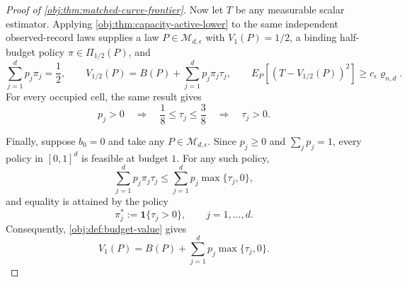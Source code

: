 \begin{proof}[Proof of \cref{obj:thm:matched-curve-frontier}]
Now let \(T\) be any measurable scalar estimator. Applying \cref{obj:thm:capacity-active-lower} to the same independent observed-record laws supplies a law \(P\in\mathcal M_{d,\epsilon}\) with \(V_1(P)=1/2\), a binding half-budget policy \(\pi\in\Pi_{1/2}(P)\), and
\[
\sum_{j=1}^d p_j\pi_j=\frac12,\qquad
V_{1/2}(P)=B(P)+\sum_{j=1}^d p_j\pi_j\tau_j,\qquad
E_P\!\left[(T-V_{1/2}(P))^2\right]\ge c_\epsilon\varrho_{n,d}.
\]
For every occupied cell, the same result gives
\[
p_j>0\quad\Longrightarrow\quad
\frac18\le\tau_j\le\frac38
\quad\Longrightarrow\quad \tau_j>0.
\]

Finally, suppose \(b_0=0\) and take any \(P\in\mathcal M_{d,\epsilon}\). Since \(p_j\ge0\) and \(\sum_jp_j=1\), every policy in \([0,1]^d\) is feasible at budget \(1\). For any such policy,
\[
\sum_{j=1}^d p_j\pi_j\tau_j
\le \sum_{j=1}^d p_j\max\{\tau_j,0\},
\]
and equality is attained by the policy
\[
\pi_j^*:=\mathbf1\{\tau_j>0\},\qquad j=1,\ldots,d.
\]
Consequently, \cref{obj:def:budget-value} gives
\[
V_1(P)=B(P)+\sum_{j=1}^d p_j\max\{\tau_j,0\}.
\]
\end{proof}

